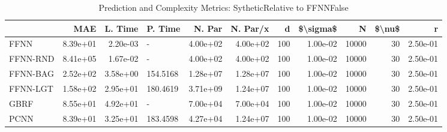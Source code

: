 \begin{table}
\centering
\caption{Prediction and Complexity Metrics: SytheticRelative to FFNNFalse}
\label{tab__Sythetic__Fix_Neurons_QTrue}
\begin{tabular}{lrrlrrrrrrr}
\toprule
{} &      MAE &  L. Time &   P. Time &   N. Par &  N. Par/x &    d &  \$\textbackslash sigma\$ &      N &  \$\textbackslash nu\$ &        r \\
\midrule
FFNN     & 8.39e+01 & 2.20e-03 &         - & 4.00e+02 &  4.00e+02 &  100 &  1.00e-02 &  10000 &     30 & 2.50e-01 \\
FFNN-RND & 8.41e+05 & 1.67e-02 &         - & 4.00e+02 &  4.00e+02 &  100 &  1.00e-02 &  10000 &     30 & 2.50e-01 \\
FFNN-BAG & 2.52e+02 & 3.58e+00 &  154.5168 & 1.28e+07 &  1.28e+07 &  100 &  1.00e-02 &  10000 &     30 & 2.50e-01 \\
FFNN-LGT & 1.58e+02 & 2.95e+01 &  180.4619 & 3.71e+09 &  1.24e+07 &  100 &  1.00e-02 &  10000 &     30 & 2.50e-01 \\
GBRF     & 8.55e+01 & 4.92e+01 &         - & 7.00e+04 &  7.00e+04 &  100 &  1.00e-02 &  10000 &     30 & 2.50e-01 \\
PCNN     & 8.39e+01 & 3.25e+01 &  183.4598 & 4.27e+04 &  1.24e+07 &  100 &  1.00e-02 &  10000 &     30 & 2.50e-01 \\
\bottomrule
\end{tabular}
\end{table}
